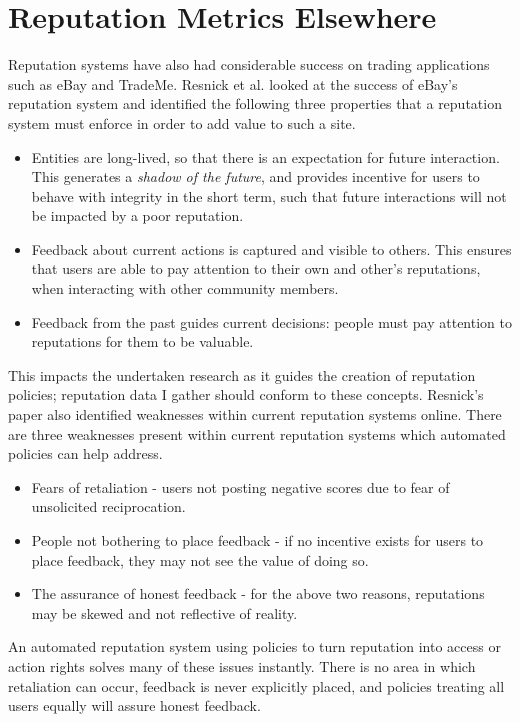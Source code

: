\section{Reputation Metrics Elsewhere}

Reputation systems have also had considerable success on trading applications such as eBay and TradeMe. Resnick et al. \cite{resnick2000reputation,resnick2002trust} looked at the success of eBay's reputation system and identified the following three properties that a reputation system must enforce in order to add value to such a site. 

\begin{itemize}
 \item Entities are long-lived, so that there is an expectation for future interaction. This generates a \textit{shadow of the future}, and provides incentive for users to behave with integrity in the short term, such that future interactions will not be impacted by a poor reputation. 
 \item Feedback about current actions is captured and visible to others. This ensures that users are able to pay attention to their own and other's reputations, when interacting with other community members. 
 \item Feedback from the past guides current decisions: people must pay attention to reputations for them to be valuable. 
\end{itemize}

This impacts the undertaken research as it guides the creation of reputation policies; reputation data I gather should conform to these concepts. Resnick's paper also identified weaknesses within current reputation systems online. There are three weaknesses present within current reputation systems which automated policies can help address. 

\begin{itemize}
 \item Fears of retaliation - users not posting negative scores due to fear of unsolicited reciprocation.
 \item People not bothering to place feedback - if no incentive exists for users to place feedback, they may not see the value of doing so.
 \item The assurance of honest feedback - for the above two reasons, reputations may be skewed and not reflective of reality.
\end{itemize}

An automated reputation system using policies to turn reputation into access or action rights solves many of these issues instantly. There is no area in which retaliation can occur, feedback is never explicitly placed, and policies treating all users equally will assure honest feedback.

